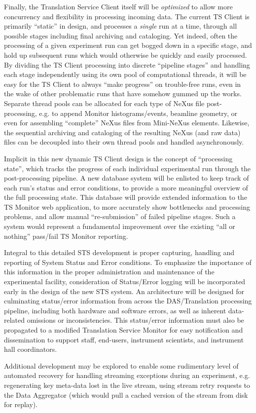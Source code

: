 Finally, the Translation Service Client itself will be {\em optimized}
to allow more concurrency and flexibility in processing incoming data.
The current TS Client is primarily ``static'' in design,
and processes a {\em single} run at a time,
through all possible stages including final archiving and cataloging.
Yet indeed, often the processing of a given experiment run can get
bogged down in a specific stage, and hold up subsequent runs which
would otherwise be quickly and easily processed.
By dividing the TS Client processing into discrete ``pipeline stages''
and handling each stage independently
using its own pool of computational threads,
it will be easy for the TS Client to always ``make progress''
on trouble-free runs, even in the wake of other problematic runs
that have somehow gummed up the works.
Separate thread pools can be allocated for each type
of NeXus file post-processing,
e.g. to append Monitor histograms/events, beamline geometry,
or even for assembling ``complete'' NeXus files from Mini-NeXus elements.
Likewise, the sequential archiving and cataloging of the resulting
NeXus (and raw data) files can be decoupled into their own thread pools
and handled asynchronously.

Implicit in this new dynamic TS Client design
is the concept of ``processing state'',
which tracks the progress of each individual experimental run
through the post-processing pipeline.
A new database system will be enlisted to keep track
of each run's status and error conditions,
to provide a more meaningful overview of the full processing state.
This database will provide extended information
to the TS Monitor web application,
to more accurately show bottlenecks and processing problems,
and allow manual ``re-submission'' of failed pipeline stages.
Such a system would represent a fundamental improvement
over the existing ``all or nothing'' pass/fail TS Monitor reporting.

Integral to this detailed STS development
is proper capturing, handling and reporting of
System Status and Error conditions.
To emphasize the importance of this information
in the proper administration and maintenance
of the experimental facility,
consideration of Status/Error logging will be incorporated
early in the design of the new STS system.
An architecture will be designed for culminating status/error information
from across the DAS/Translation processing pipeline,
including both hardware and software errors,
as well as inherent data-related omissions or inconsistencies.
This status/error information must also be propagated
to a modified Translation Service Monitor
for easy notification and dissemination to support staff, end-users,
instrument scientists, and instrument hall coordinators.

Additional development may be explored to enable some rudimentary level of
automated recovery for handling streaming exceptions during an experiment,
e.g. regenerating key meta-data lost in the live stream,
using stream retry requests to the Data Aggregator
(which would pull a cached version of the stream from disk for replay).

